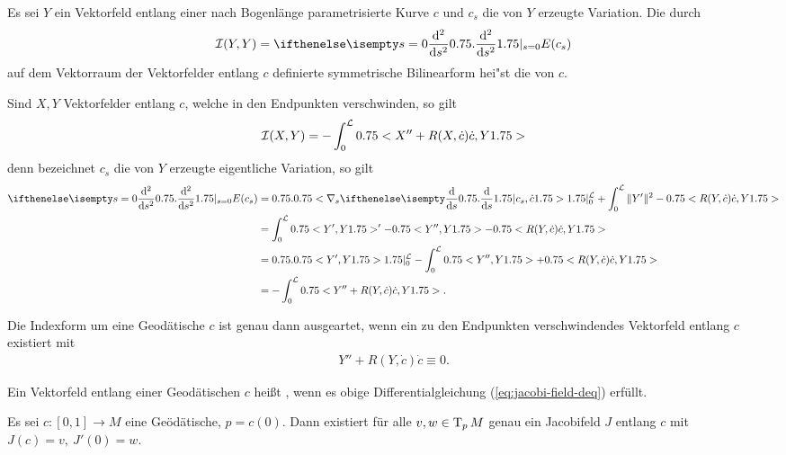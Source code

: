 \begin{Dfn}
  Es sei $Y$ ein Vektorfeld entlang einer nach Bogenlänge
  parametrisierte Kurve $c$ und $c_s$ die von $Y$ erzeugte
  Variation. Die durch
  \begin{align*}
    \calI(Y,Y) = \difffrac[s=0]{^2}{s^2} E(c_s)
  \end{align*}
  auf dem Vektorraum der Vektorfelder entlang $c$ definierte
  symmetrische Bilinearform hei"st die  von $c$.
\end{Dfn}

Sind $X,Y$ Vektorfelder entlang $c$, welche in den Endpunkten
verschwinden, so gilt
\begin{align*}
  \operatorname{\mathcal{I}}(X,Y) = -\int_0^{\mathcal L}0.75<X'' + R(X,\dot c)\dot
    c,Y1.75>
\end{align*}
denn bezeichnet $c_s$ die von $Y$ erzeugte eigentliche Variation, so
gilt
\begin{align*}
  \difffrac[s=0]{^2}{s^2}E(c_s) & =
  \left.\left<\nabla_s\difffrac{}{s}c_s,\dot
      c\right>\right|_0^{\mathcal L} + \int_0^{\mathcal L}\|Y'\|^2 -
  \left<R(Y,\dot c)\dot c,Y\right>\\
  & = \int_0^{\mathcal L}\left<Y',Y\right>' - \left<Y'',Y\right> -
  \left<R(Y,\dot c)\dot c,Y\right>\\
  & = \left.\left<Y',Y\right>\right|_0^{\mathcal L} - \int_0^{\mathcal
    L} \left<Y'',Y\right> + \left<R(Y,\dot c)\dot c,Y\right>\\
  & = - \int_0^{\mathcal L}\left<Y'' + R(Y,\dot c) \dot c, Y\right>.
\end{align*}

Die Indexform um eine Geodätische $c$ ist genau dann ausgeartet, wenn
ein zu den Endpunkten verschwindendes Vektorfeld entlang $c$ existiert
mit
\begin{align*}
  Y'' + R(Y,\dot c) \dot c \equiv 0. \label{eq:jacobi-field-deq}
\end{align*}

\begin{Dfn}
  Ein Vektorfeld entlang einer Geodätischen $c$ heißt
  , wenn es obige Differentialgleichung
  (\ref{eq:jacobi-field-deq}) erfüllt.
\end{Dfn}

\begin{Lemma}\label{thm:lemma-9-4}
  Es sei $c \colon [0,1] \to M$ eine Geödätische, $p = c(0)$. Dann
  existiert für alle $v,w \in \operatorname{T}_pM$ genau ein Jacobifeld $J$ entlang
  $c$ mit $J(c) = v, \ J'(0) = w$.
\end{Lemma}

